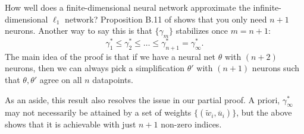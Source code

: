 \begin{remark}
How well does a finite-dimensional neural network approximate the infinite-dimensional $\ell_1$ network? Proposition B.11 of \cite{wei2020regularization} shows that you only need $n+1$ neurons. Another way to say this is that $\{\gamma_m\}$ stabilizes once $m=n+1$:
\begin{equation}
\gamma_1^* \le \gamma_2^* \le \dots \le \gamma_{n+1}^* = \gamma_\infty^*.
\end{equation}
The main idea of the proof is that if we have a neural net $\theta$ with $(n+2)$ neurons, then we can always pick a simplification $\theta'$ with $(n+1)$ neurons such that $\theta,\theta'$ agree on all $n$ datapoints.

As an aside, this result also resolves the issue in our partial proof. A priori, $\gamma_{\infty}^*$ may not necessarily be attained by a set of weights $\{(\widetilde w_i, \overline u_i)\}$, but the above shows that it is achievable with just $n+1$ non-zero indices.

\end{remark}
